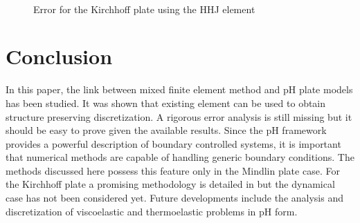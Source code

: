 \documentclass{ifacconf}
\begin{document}
\begin{figure}[ht]%
	\centering
	\hspace{8pt}%
	 \\
	\caption[errorHHF]{Error for the Kirchhoff plate using the HHJ element}%
	\label{fig:errorHHJ}%
\end{figure}

\section{Conclusion}
In this paper, the link between mixed finite element method and pH plate models has been studied. It was shown that existing element can be used to obtain structure preserving discretization. A rigorous error analysis is still missing but it should be easy to prove given the available results. Since the pH framework provides a powerful description of boundary controlled systems, it is important that numerical methods are capable of handling generic boundary conditions. The methods discussed here possess this feature only in the Mindlin plate case. For the Kirchhoff plate a promising methodology is detailed in \cite{mixed_kirchhoff} but the dynamical case has not been considered yet. Future developments include the analysis and discretization of viscoelastic and thermoelastic problems in pH form.
\end{document}
